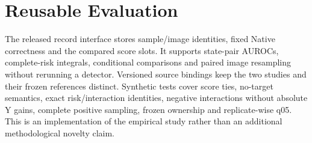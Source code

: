 \documentclass[10pt,twocolumn,letterpaper]{article}
\begin{document}
\section{Reusable Evaluation}
The released record interface stores sample/image identities, fixed Native
correctness and the compared score slots. It supports state-pair AUROCs,
complete-risk integrals, conditional comparisons and paired image resampling
without rerunning a detector. Versioned source bindings keep the two studies
and their frozen references distinct. Synthetic tests cover score ties,
no-target semantics, exact risk/interaction identities, negative interactions
without absolute Y gains, complete positive sampling, frozen ownership and
replicate-wise q05. This is an implementation of the empirical study rather
than an additional methodological novelty claim.

{\small}
\end{document}
